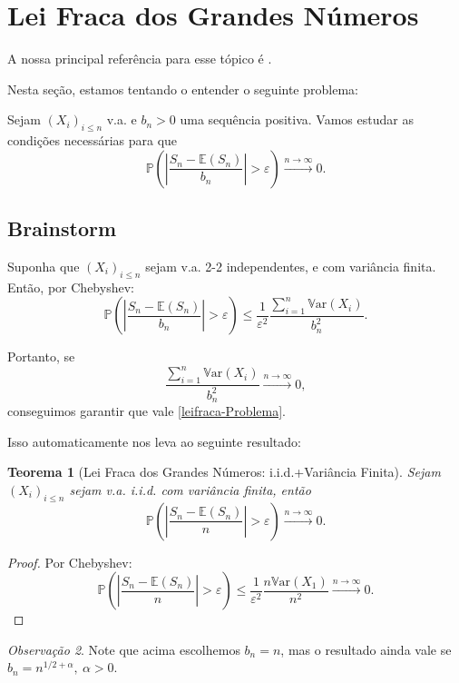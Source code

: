 \documentclass[12pt,a4paper,oneside]{book}
\newtheorem{theorem}{Teorema}[section]
\theoremstyle{definition}
\theoremstyle{remark}
\newtheorem{remark}[theorem]{Observa\c{c}\~ao}
\numberwithin{equation}{section}
\newcommand{\e}{\varepsilon}
\newcommand{\E}{\mathbb{E}}
\newcommand{\pr}{\mathbb{P}}
\newcommand{\Var}{\mathbb{V}\text{ar}}
\begin{document}
\section{Lei Fraca dos Grandes Números}
A nossa principal referência para esse tópico  é \cite{durrett}.


Nesta seção, estamos tentando o entender o seguinte problema:

\begin{tcolorbox}[colback = yellow!60]
Sejam $(X_i)_{i\leq n}$ v.a. e $b_n>0$ uma sequência positiva. Vamos estudar as condições necessárias para que
\begin{equation}\label{leifraca-Problema}
\pr\left(\left|\dfrac{S_n-\E(S_n)}{b_n}\right|>\e \right) \xrightarrow{n\rightarrow \infty}0.
\end{equation} 
\end{tcolorbox}





\subsection{Brainstorm} Suponha que $(X_i)_{i\leq n}$ sejam v.a. 2-2 independentes, e com variância finita. Então, por Chebyshev:
$$\pr\left(\left|\dfrac{S_n-\E(S_n)}{b_n}\right|>\e \right)\leq \dfrac{1}{\e^2} \dfrac{\sum_{i=1}^n \Var(X_i)}{b_n^2}.$$

\begin{tcolorbox}[colback = yellow!60]

Portanto, se 
$$\dfrac{\sum_{i=1}^n \Var(X_i)}{b_n^2} \xrightarrow{n\rightarrow \infty}0, $$
conseguimos garantir que vale \ref{leifraca-Problema}.

\end{tcolorbox}

Isso automaticamente nos leva ao seguinte resultado:


\begin{tcolorbox}
\begin{theorem}[Lei Fraca dos Grandes Números:  i.i.d.+Variância Finita]
Sejam $(X_i)_{i\leq n}$ sejam v.a. i.i.d. com variância finita, então
$$ \pr\left(\left|\dfrac{S_n-\E(S_n)}{n}\right|>\e \right) \xrightarrow{n\rightarrow \infty}0.$$
\end{theorem}
\begin{proof}
Por Chebyshev:
$$\pr\left(\left|\dfrac{S_n-\E(S_n)}{n}\right|>\e \right)\leq \dfrac{1}{\e^2} \dfrac{n \Var(X_1)}{n^2} \xrightarrow{n\rightarrow \infty}0.$$
\end{proof}
\begin{remark}
Note que acima escolhemos $b_n = n$, mas o resultado ainda vale se $b_n = n^{1/2+\alpha}, \ \alpha>0.$
\end{remark}
\end{tcolorbox}
\end{document}
